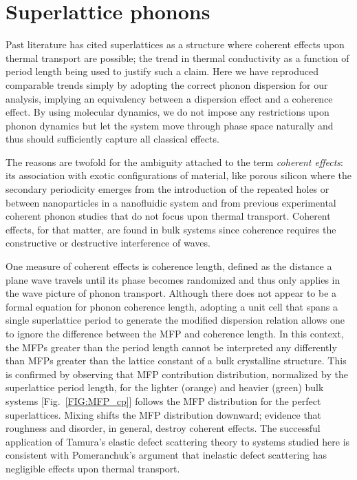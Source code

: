 \documentclass[aps,prb,preprint,preprintnumbers,amsmath,amssymb,floatfix,superscriptaddress]{revtex4}
\begin{document}
\section{Superlattice phonons}

Past literature has cited superlattices as a structure where coherent effects upon thermal transport are possible; the trend in thermal conductivity as a function of period length being used to justify such a claim.\cite{PhysRevB.67.195311,PhysRevB.72.174302,PhysRevB.61.3091} Here we have reproduced comparable trends simply by adopting the correct phonon dispersion for our analysis, implying an equivalency between a dispersion effect and a coherence effect. By using molecular dynamics, we do not impose any restrictions upon phonon dynamics but let the system move through phase space naturally and thus should sufficiently capture all classical effects. 

The reasons are twofold for the ambiguity attached to the term \textit {coherent effects}: its association with exotic configurations of material, like porous silicon \cite{doi:10.1021/nl102918q} where the secondary periodicity emerges from the introduction of the repeated holes or between nanoparticles in a nanofluidic system \cite{Keblinski2002855} and from previous experimental coherent phonon studies \cite{PhysRevLett.73.740,PhysRevB.75.195309} that do not focus upon thermal transport. Coherent effects, for that matter, are found in bulk systems since coherence requires the constructive or destructive interference of waves.

One measure of coherent effects is coherence length, defined as the distance a plane wave travels until its phase becomes randomized and thus only applies in the wave picture of phonon transport. Although there does not appear to be a formal equation for phonon coherence length,\cite{chen2005nanoscale} adopting a unit cell that spans a single superlattice period to generate the modified dispersion relation allows one to ignore the difference between the MFP and coherence length.\cite{PhysRevB.67.195311} In this context, the MFPs greater than the period length cannot be interpreted any differently than MFPs greater than the lattice constant of a bulk crystalline structure. This is confirmed by observing that MFP contribution distribution, normalized by the superlattice period length, for the lighter (orange) and heavier (green) bulk systems [Fig.~\ref{FIG:MFP_cp}] follows the MFP distribution for the perfect superlattices. Mixing shifts the MFP distribution downward; evidence that roughness and disorder, in general, destroy coherent effects.\cite{PhysRevB.67.195311,dames_682} The successful application of Tamura's elastic defect scattering theory to systems studied here is consistent with Pomeranchuk's argument that inelastic defect scattering has negligible effects upon thermal transport.\cite{pomeranchuk1942thermal} 
\end{document}
